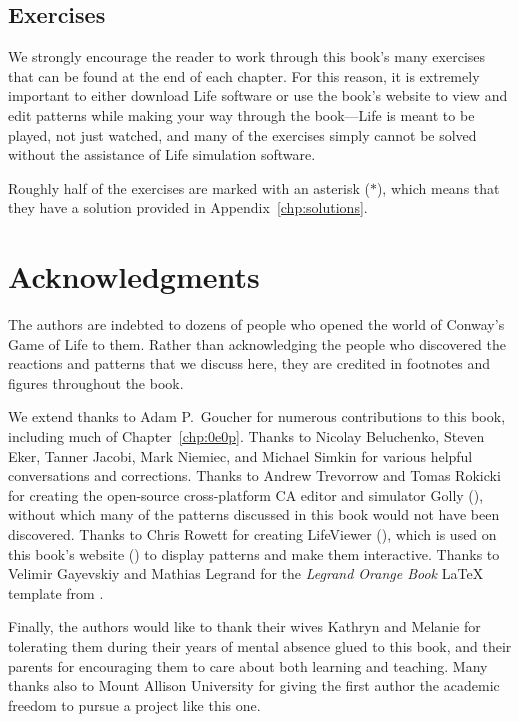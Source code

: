 \subsection*{Exercises}

We strongly encourage the reader to work through this book's many exercises that can be found at the end of each chapter. For this reason, it is extremely important to either download Life software or use the book's website to view and edit patterns while making your way through the book---Life is meant to be played, not just watched, and many of the exercises simply cannot be solved without the assistance of Life simulation software.

Roughly half of the exercises are marked with an asterisk ($\ast$), which means that they have a solution provided in Appendix~\ref{chp:solutions}.


\section*{Acknowledgments}

The authors are indebted to dozens of people who opened the world of Conway's Game of Life to them. Rather than acknowledging the people who discovered the reactions and patterns that we discuss here, they are credited in footnotes and figures throughout the book.

We extend thanks to Adam P.~Goucher for numerous contributions to this book, including much of Chapter~\ref{chp:0e0p}. Thanks to Nicolay Beluchenko, Steven Eker, Tanner Jacobi, Mark Niemiec, and Michael Simkin for various helpful conversations and corrections. Thanks to Andrew Trevorrow and Tomas Rokicki for creating the open-source cross-platform CA editor and simulator Golly (), without which many of the patterns discussed in this book would not have been discovered. Thanks to Chris Rowett for creating LifeViewer (), which is used on this book's website () to display patterns and make them interactive. Thanks to Velimir Gayevskiy and Mathias Legrand for the \emph{Legrand Orange Book} LaTeX template from .

Finally, the authors would like to thank their wives Kathryn and Melanie for tolerating them during their years of mental absence glued to this book, and their parents for encouraging them to care about both learning and teaching. Many thanks also to Mount Allison University for giving the first author the academic freedom to pursue a project like this one.